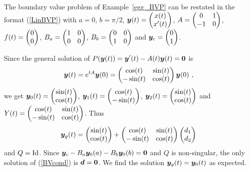 \begin{egg}
The boundary value problem of Example~\ref{egg_BVP} can be restated in
the format (\ref{LinBVP}) with $a=0$, $b=\pi/2$,
$\displaystyle \bm{y}(t) = \begin{pmatrix} x(t) \\ x'(t) \end{pmatrix}$, 
$\displaystyle A = \begin{pmatrix} 0 & 1 \\ -1 & 0 \end{pmatrix}$,
$\displaystyle f(t) = \begin{pmatrix} 0 \\ 0 \end{pmatrix}$,
$\displaystyle B_a = \begin{pmatrix} 1 & 0 \\ 0 & 0 \end{pmatrix}$,
$\displaystyle B_b = \begin{pmatrix} 0 & 0 \\ 1 & 0 \end{pmatrix}$ and
$\displaystyle \bm{y}_c = \begin{pmatrix} 0 \\ 1 \end{pmatrix}$.

Since the general solution of
$\displaystyle P(\bm{y}(t)) = \bm{y}'(t) - A(t) \bm{y}(t) = \bm{0}$ is
\[
\bm{y}(t) = e^{tA} \bm{y}(0) =
\begin{pmatrix} \cos(t) & \sin(t) \\ -\sin(t) & \cos(t) \end{pmatrix}
\bm{y}(0) \ ,
\]
we get
$\displaystyle \bm{y}_0(t) =
\begin{pmatrix} \sin(t) \\ \cos(t) \end{pmatrix}$,
$\displaystyle \bm{y}_1(t) =
\begin{pmatrix} \cos(t) \\ -\sin(t) \end{pmatrix}$,
$\displaystyle \bm{y}_2(t) =
\begin{pmatrix} \sin(t) \\ \cos(t) \end{pmatrix}$ and\\
$\displaystyle Y(t) = \begin{pmatrix}
\cos(t) & \sin(t) \\  -\sin(t) & \cos(t) \end{pmatrix}$.  Thus
\[
\bm{y}_g(t) =
\begin{pmatrix} \sin(t) \\ \cos(t) \end{pmatrix}
+ \begin{pmatrix} \cos(t) & \sin(t) \\ -\sin(t) & \cos(t) \end{pmatrix}
\begin{pmatrix} d_1 \\ d_2 \end{pmatrix}
\]
and $\displaystyle Q = \operatorname{Id}$.  Since
$\displaystyle \bm{y}_c - B_a\bm{y}_0(a) - B_b\bm{y}_0(b) = \bm{0}$
and $Q$ is non-singular, the only solution of
(\ref{BVcond}) is $\bm{d} = \bm{0}$.  We find the solution
$\bm{y}_g(t) = \bm{y}_0(t)$ as expected.
\end{egg}


